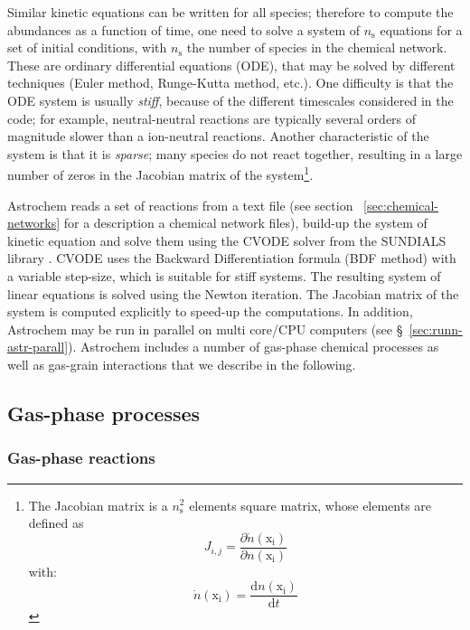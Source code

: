 \documentclass[a4paper,12pt]{article}
\newcommand{\conc}[1]{n(\mathrm{#1})}
\begin{document}
Similar kinetic equations can be written for all species; therefore to
compute the abundances as a function of time, one need to solve a
system of $n_\mathrm{s}$ equations for a set of initial conditions,
with $n_\mathrm{s}$ the number of species in the chemical
network. These are ordinary differential equations (ODE), that may be
solved by different techniques (Euler method, Runge-Kutta method,
etc.). One difficulty is that the ODE system is usually \emph{stiff},
because of the different timescales considered in the code; for
example, neutral-neutral reactions are typically several orders of
magnitude slower than a ion-neutral reactions. Another characteristic
of the system is that it is \emph{sparse}; many species do not react
together, resulting in a large number of zeros in the Jacobian matrix
of the system\footnote{The Jacobian matrix is a $n_\mathrm{s}^2$
  elements square matrix, whose elements are defined as
  \begin{equation}
     J_{i,j} = \frac{\partial
       \dot\conc{x_{i}}}{\partial \conc{x_{i}}}
   \end{equation}
   \noindent
   with:
   \begin{equation}
     \dot\conc{x_{i}} = \frac{\mathrm{d} \conc{x_{i}}}{\mathrm{d}t}
   \end{equation}}.

 Astrochem reads a set of reactions from a text file (see section~
 \ref{sec:chemical-networks} for a description a chemical network
 files), build-up the system of kinetic equation and solve them using
 the CVODE solver \citep{Cohen96} from the SUNDIALS library
 \citep{Hindmarsh05}. CVODE uses the Backward Differentiation formula
 (BDF method) with a variable step-size, which is suitable for stiff
 systems. The resulting system of linear equations is solved using the
 Newton iteration. The Jacobian matrix of the system is computed
 explicitly to speed-up the computations. In addition, Astrochem may
 be run in parallel on multi core/CPU computers (see
 \S~\ref{sec:runn-astr-parall}). Astrochem includes a number of
 gas-phase chemical processes as well as gas-grain interactions that
 we describe in the following.

\subsection{Gas-phase processes}
\label{sec:gas-phase-processes}
 
\subsubsection{Gas-phase reactions}
\label{sec:gas-phase-reactions}
\end{document}
